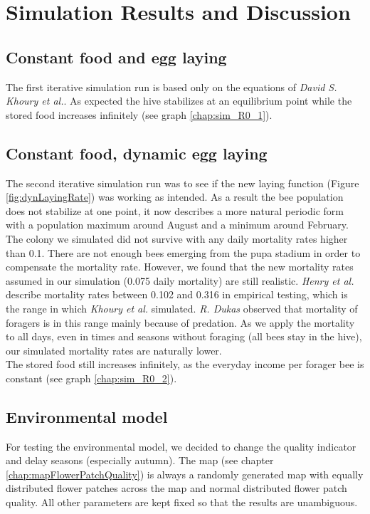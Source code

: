 \section{Simulation Results and Discussion}

\subsection{Constant food and egg laying}
	\label{chap:constantFoodConstantLaying}
	The first iterative simulation run is based only on the equations of \textit{David S. Khoury et al.}\cite{khoury13}. As expected the hive stabilizes at an equilibrium point while the stored food increases infinitely (see graph \ref{chap:sim_R0_1}).

\subsection{Constant food, dynamic egg laying}
	\label{chap:constantFoodDynamicLaying}
	The second iterative simulation run was to see if the new laying function (Figure \ref{fig:dynLayingRate})  was working as intended. As a result the bee population does not stabilize at one point, it now describes a more natural periodic form with a population maximum around August and a minimum around February.\\
	
	The colony we simulated did not survive with any daily mortality rates higher than 0.1. There are not enough bees emerging from the pupa stadium in order to compensate the mortality rate. However, we found that the new mortality rates assumed in our simulation (0.075 daily mortality) are still realistic. \textit{Henry et al.} \cite{henry12} describe mortality rates between 0.102 and 0.316 in empirical testing, which is the range in which \textit{Khoury et al.} \cite{khoury13} simulated. \textit{R. Dukas} \cite{dukas08} observed that mortality of foragers is in this range mainly because of predation. As we apply the mortality to all days, even in times and seasons without foraging (all bees stay in the hive), our simulated mortality rates are naturally lower.\\
	
	The stored food still increases infinitely, as the everyday income per forager bee is constant (see graph \ref{chap:sim_R0_2}).

\subsection{Environmental model}
	\label{chap:environmentalModelDiscussion}
	For testing the environmental model, we decided to change the quality indicator and delay seasons (especially autumn). The map (see chapter \ref{chap:mapFlowerPatchQuality}) is always a randomly generated map with equally distributed flower patches across the map and normal distributed flower patch quality. All other parameters are kept fixed so that the results are unambiguous.
	
